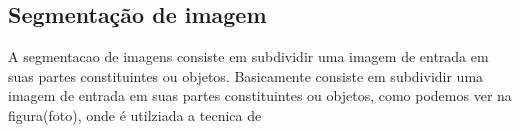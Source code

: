 \subsection{Segmentação de imagem}
A segmentacao de imagens consiste em subdividir uma imagem de entrada em suas partes constituintes ou objetos\cite{o_que_e_segmentacao_de_imagens}. Basicamente consiste em subdividir uma imagem de entrada em suas partes constituintes ou objetos, como podemos ver na figura(foto), onde é utilziada a tecnica de 

